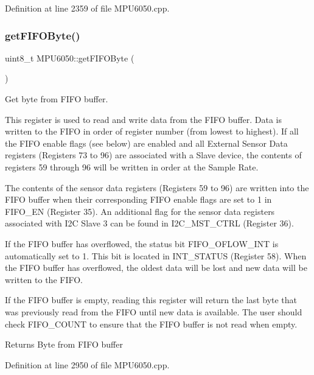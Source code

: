 Definition at line 2359 of file M\+P\+U6050.\+cpp.

\mbox{\label{classMPU6050_a7733011d30d5b64564f6b5422d8639ae}} 
\subsubsection{\texorpdfstring{getFIFOByte()}{getFIFOByte()}}
{\footnotesize\ttfamily uint8\+\_\+t M\+P\+U6050\+::get\+F\+I\+F\+O\+Byte (\begin{DoxyParamCaption}{ }\end{DoxyParamCaption})}



Get byte from F\+I\+FO buffer. 

This register is used to read and write data from the F\+I\+FO buffer. Data is written to the F\+I\+FO in order of register number (from lowest to highest). If all the F\+I\+FO enable flags (see below) are enabled and all External Sensor Data registers (Registers 73 to 96) are associated with a Slave device, the contents of registers 59 through 96 will be written in order at the Sample Rate.

The contents of the sensor data registers (Registers 59 to 96) are written into the F\+I\+FO buffer when their corresponding F\+I\+FO enable flags are set to 1 in F\+I\+F\+O\+\_\+\+EN (Register 35). An additional flag for the sensor data registers associated with I2C Slave 3 can be found in I2\+C\+\_\+\+M\+S\+T\+\_\+\+C\+T\+RL (Register 36).

If the F\+I\+FO buffer has overflowed, the status bit F\+I\+F\+O\+\_\+\+O\+F\+L\+O\+W\+\_\+\+I\+NT is automatically set to 1. This bit is located in I\+N\+T\+\_\+\+S\+T\+A\+T\+US (Register 58). When the F\+I\+FO buffer has overflowed, the oldest data will be lost and new data will be written to the F\+I\+FO.

If the F\+I\+FO buffer is empty, reading this register will return the last byte that was previously read from the F\+I\+FO until new data is available. The user should check F\+I\+F\+O\+\_\+\+C\+O\+U\+NT to ensure that the F\+I\+FO buffer is not read when empty.

\begin{DoxyReturn}{Returns}
Byte from F\+I\+FO buffer 
\end{DoxyReturn}


Definition at line 2950 of file M\+P\+U6050.\+cpp.

